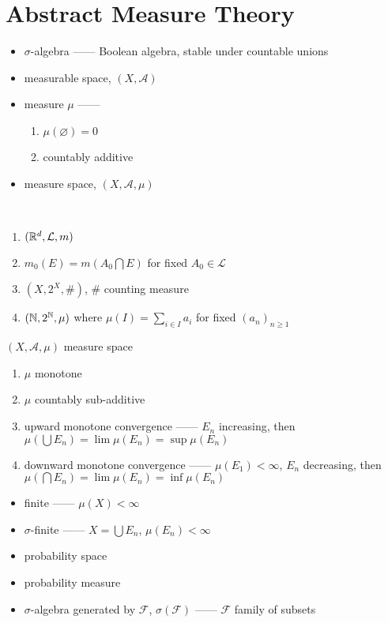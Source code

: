 \section{Abstract Measure Theory}\label{sec:abstract-measure-theory}

\begin{itemize}
    \item $\sigma$-algebra ------ Boolean algebra, stable under countable unions
    \item measurable space, $(X, \mathcal{A})$
    \item measure $\mu$ ------
    \begin{enumerate}
        \item $\mu(\varnothing) = 0$
        \item countably additive
    \end{enumerate}
    \item measure space, $(X, \mathcal{A}, \mu)$
\end{itemize}

\begin{example}\,
    \begin{enumerate}
        \item $(\mathbb{R}^d, \mathcal{L}, m)$
        \item $m_0(E) = m\left(A_0 \bigcap E\right)$ for fixed $A_0 \in \mathcal{L}$
        \item $(X, 2^X, \#)$, $\#$ counting measure
        \item $(\mathbb{N}, 2^{\mathbb{N}}, \mu)$ where $\mu(I) = \sum_{i\in I} a_i$ for fixed $(a_n)_{n\geq 1}$
    \end{enumerate}
\end{example}

\begin{prop}
    $(X, \mathcal{A}, \mu)$ measure space
    \begin{enumerate}
        \item $\mu$ monotone
        \item $\mu$ countably sub-additive
        \item upward monotone convergence ------ $E_n$ increasing, then $\mu(\bigcup E_n) = \lim \mu(E_n) = \sup \mu(E_n)$
        \item downward monotone convergence ------ $\mu(E_1) < \infty$, $E_n$ decreasing, then $\mu(\bigcap E_n) = \lim \mu(E_n) = \inf \mu(E_n)$
    \end{enumerate}
\end{prop}

\begin{itemize}
    \item finite ------ $\mu(X) < \infty$
    \item $\sigma$-finite ------ $X = \bigcup E_n$, $\mu(E_n) < \infty$
    \item probability space
    \item probability measure
    \item $\sigma$-algebra generated by $\mathcal{F}$, $\sigma(\mathcal{F})$ ------ $\mathcal{F}$ family of subsets
\end{itemize}

